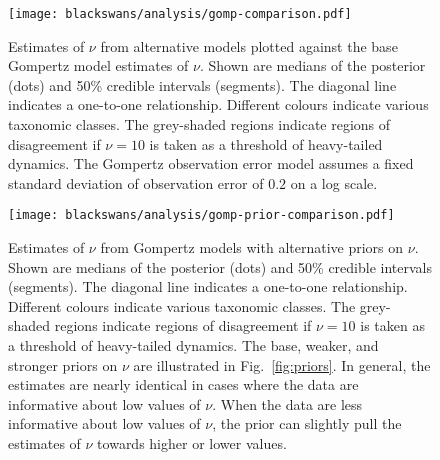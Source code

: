 \clearpage

\begin{figure}[htbp]
\begin{center}
\texttt{[image: blackswans/analysis/gomp-comparison.pdf]}

\caption[Estimates of $\nu$ from alternative models plotted against the base
Gompertz model estimates of $\nu$.]{Estimates of $\nu$ from alternative models
  plotted against the base Gompertz model estimates of $\nu$. Shown are
  medians of the posterior (dots) and 50\% credible intervals (segments). The
  diagonal line indicates a one-to-one relationship. Different colours
  indicate various taxonomic classes. The grey-shaded regions indicate regions
  of disagreement if $\nu = 10$ is taken as a threshold of heavy-tailed
  dynamics. The Gompertz observation error model assumes a fixed standard
  deviation of observation error of $0.2$ on a log scale.}

\label{fig:alt}
\end{center}
\end{figure}

\clearpage

\begin{figure}[htbp]
\begin{center}
\texttt{[image: blackswans/analysis/gomp-prior-comparison.pdf]}

\caption[Estimates of $\nu$ from Gompertz models with alternative priors on
$\nu$.]{Estimates of $\nu$ from Gompertz models with alternative priors on
  $\nu$. Shown are medians of the posterior (dots) and 50\% credible intervals
  (segments). The diagonal line indicates a one-to-one relationship. Different
  colours indicate various taxonomic classes. The grey-shaded regions indicate
  regions of disagreement if $\nu = 10$ is taken as a threshold of
  heavy-tailed dynamics. The base, weaker, and stronger priors on $\nu$ are
  illustrated in Fig.~\ref{fig:priors}. In general, the estimates are nearly
  identical in cases where the data are informative about low values of $\nu$.
  When the data are less informative about low values of $\nu$, the prior can
  slightly pull the estimates of $\nu$ towards higher or lower values.}

\label{fig:alt-priors}
\end{center}
\end{figure}

\clearpage


